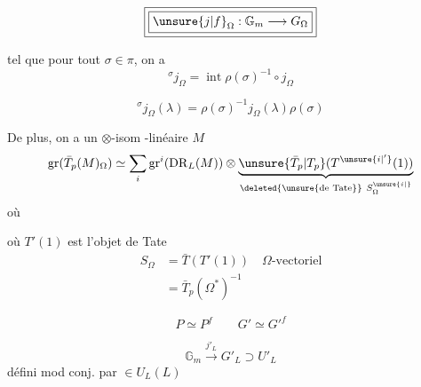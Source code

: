 \[\boxed{\boxed{\unsure{j|f}_\Omega:\mathbb G_m\longrightarrow G_\Omega}}\]

tel que pour tout $\sigma\in\pi$, on a
\[\boxed{{}^{\sigma}j_\Omega=\operatorname{int}\rho(\sigma)^{-1}\circ j_\Omega}\]



\[{}^{\sigma}j_\Omega(\lambda)=\rho(\sigma)^{-1}j_\Omega(\lambda)\rho(\sigma)\]

De plus, on a un $\otimes$-isom -linéaire  $M$ 
\[
\operatorname{gr}(\bar T_p(M)_\Omega)\simeq\sum_i\operatorname{gr}^i(\mathrm{DR}_{L}(M))\otimes\underbrace{\unsure{\bar T_p|T_p}(T^{\unsure{i|'}}(1))}_{\deleted{\unsure{\text{de Tate}}}\ S_\Omega^{\unsure{i|{}}}}
\]
où

où $T'(1)$ est l'objet de Tate
\[\begin{aligned} S_\Omega&=\bar T(T'(1))\quad\Omega\text{-vectoriel}\\&=\bar T_p(\Omega^{*})^{-1}\end{aligned}\]

\[P\simeq P^f\qquad G'\simeq G'^{f}\]

\[\mathbb G_m\xrightarrow{j'_L}G'_L\supset U'_L\]
défini mod conj. par $\in U_L(L)$



